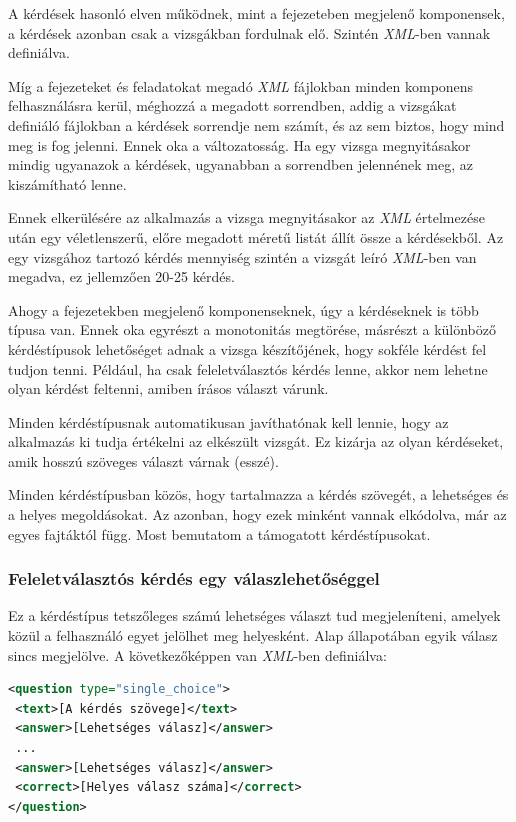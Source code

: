 \documentclass[12pt,a4paper]{article}
\newcommand{\xml}{\textit{XML}\xspace}
\begin{document}
	A kérdések hasonló elven működnek, mint a fejezeteben megjelenő komponensek, a kérdések azonban csak a vizsgákban fordulnak elő. Szintén \xml-ben vannak definiálva.
	
	Míg a fejezeteket és feladatokat megadó \xml fájlokban minden komponens felhasználásra kerül, méghozzá a megadott sorrendben, addig a vizsgákat definiáló fájlokban a kérdések sorrendje nem számít, és az sem biztos, hogy mind meg is fog jelenni. Ennek oka a változatosság. Ha egy vizsga megnyitásakor mindig ugyanazok a kérdések, ugyanabban a sorrendben jelennének meg, az kiszámítható lenne.
	
	Ennek elkerülésére az alkalmazás a vizsga megnyitásakor az \xml értelmezése után egy véletlenszerű, előre megadott méretű listát állít össze a kérdésekből. Az egy vizsgához tartozó kérdés mennyiség szintén a vizsgát leíró \xml-ben van megadva, ez jellemzően 20-25 kérdés.
	
	Ahogy a fejezetekben megjelenő komponenseknek, úgy a kérdéseknek is több típusa van. Ennek oka egyrészt a monotonitás megtörése, másrészt a különböző kérdéstípusok lehetőséget adnak a vizsga készítőjének, hogy sokféle kérdést fel tudjon tenni. Például, ha csak feleletválasztós kérdés lenne, akkor nem lehetne olyan kérdést feltenni, amiben írásos választ várunk.
	
	Minden kérdéstípusnak automatikusan javíthatónak kell lennie, hogy az alkalmazás ki tudja értékelni az elkészült vizsgát. Ez kizárja az olyan kérdéseket, amik hosszú szöveges választ várnak (esszé).
	
	Minden kérdéstípusban közös, hogy tartalmazza a kérdés szövegét, a lehetséges és a helyes megoldásokat. Az azonban, hogy ezek minként vannak elkódolva, már az egyes fajtáktól függ. Most bemutatom a támogatott kérdéstípusokat.
	
	\subsubsection{Feleletválasztós kérdés egy válaszlehetőséggel}
	
	Ez a kérdéstípus tetszőleges számú lehetséges választ tud megjeleníteni, amelyek közül a felhasználó egyet jelölhet meg helyesként. Alap állapotában egyik válasz sincs megjelölve. A következőképpen van \xml-ben definiálva:
	
		\bigskip
	\begin{lstlisting}[language=XML]
<question type="single_choice">
 <text>[A kérdés szövege]</text>
 <answer>[Lehetséges válasz]</answer>
 ...
 <answer>[Lehetséges válasz]</answer>
 <correct>[Helyes válasz száma]</correct>
</question>
	\end{lstlisting}
	\bigskip
	
\end{document}
